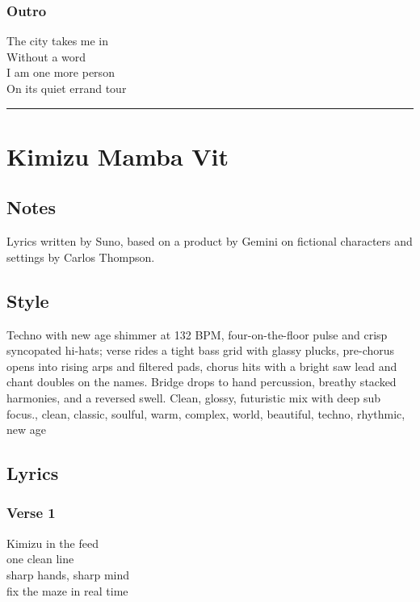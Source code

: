 \subsubsection{Outro}\label{outro}

The city takes me in\\
Without a word\\
I am one more person\\
On its quiet errand tour

\begin{center}\rule{0.5\linewidth}{0.5pt}\end{center}

\section{Kimizu Mamba Vit}\label{kimizu-mamba-vit}

\subsection{Notes}\label{notes-7}

Lyrics written by Suno, based on a product by Gemini on fictional
characters and settings by Carlos Thompson.

\subsection{Style}\label{style-7}

Techno with new age shimmer at 132 BPM, four-on-the-floor pulse and
crisp syncopated hi-hats; verse rides a tight bass grid with glassy
plucks, pre-chorus opens into rising arps and filtered pads, chorus hits
with a bright saw lead and chant doubles on the names. Bridge drops to
hand percussion, breathy stacked harmonies, and a reversed swell. Clean,
glossy, futuristic mix with deep sub focus., clean, classic, soulful,
warm, complex, world, beautiful, techno, rhythmic, new age

\subsection{Lyrics}\label{lyrics-7}

\subsubsection{Verse 1}\label{verse-1-3}

Kimizu in the feed\\
one clean line\\
sharp hands, sharp mind\\
fix the maze in real time

